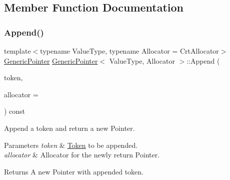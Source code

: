 \subsection{Member Function Documentation}
\mbox{\label{classGenericPointer_aa8f86c0f330807f337351a95ae254b78}} 
\subsubsection{\texorpdfstring{Append()}{Append()}\hspace{0.1cm}{\footnotesize\ttfamily [1/2]}}
{\footnotesize\ttfamily template$<$typename Value\+Type, typename Allocator = Crt\+Allocator$>$ \\
\hyperlink{classGenericPointer}{Generic\+Pointer} \hyperlink{classGenericPointer}{Generic\+Pointer}$<$ Value\+Type, Allocator $>$\+::Append (\begin{DoxyParamCaption}\item[{const \hyperlink{structGenericPointer_1_1Token}{Token} \&}]{token,  }\item[{Allocator $\ast$}]{allocator = {} }\end{DoxyParamCaption}) const\hspace{0.3cm}{\ttfamily [inline]}}



Append a token and return a new Pointer. 


\begin{DoxyParams}{Parameters}
{\em token} & \hyperlink{structGenericPointer_1_1Token}{Token} to be appended. \\
\hline
{\em allocator} & Allocator for the newly return Pointer. \\
\hline
\end{DoxyParams}
\begin{DoxyReturn}{Returns}
A new Pointer with appended token. 
\end{DoxyReturn}
\mbox{\label{classGenericPointer_a9f8a1711f5b8e0d951c25c6c65326f77}} 
